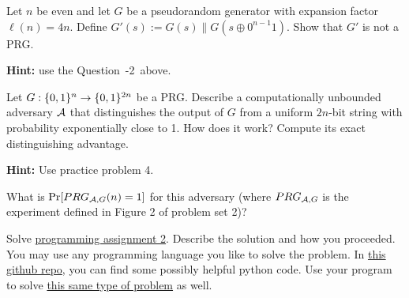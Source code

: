 \documentclass[a4paper,10pt]{article}
\begin{document}
\begin{question}{2}
Let $n$ be even and let $G$ be a pseudorandom generator with expansion factor $\ell(n)=4n$.
Define $G'(s):=G(s) \| G(s \oplus 0^{n-1}1)$. Show that $G'$ is not a PRG.

\noindent\textbf{Hint:} use the Question~\the\numexpr\value{questionnr}-2\relax\ above.
\end{question}
\begin{solution}
\end{solution}

\begin{question}{4}
Let $G:\{0,1\}^n \rightarrow \{0,1\}^{2n}$ be a PRG. Describe a computationally unbounded adversary $\mathcal{A}$ that distinguishes the output of $G$ from a uniform $2n$-bit string with probability exponentially close to 1. How does it work? Compute its exact distinguishing advantage.

\noindent\textbf{Hint:} Use practice problem 4.

What is $\Pr[PRG_{\mathcal{A},G}(n) =1]$ for this adversary (where $PRG_{\mathcal{A},G}$ is the experiment defined in Figure 2 of problem set 2)?
\end{question}
\begin{solution}
\end{solution}



\begin{programming}{8}
Solve \href{https://www.coursera.org/learn/cryptography/supplement/3Iajv/programming-assignment-2}{programming assignment 2}. Describe the solution and how you proceeded. You may use any programming language you like to solve the problem.
In \href{https://github.com/cschaffner/ModernCryptographyCourse/tree/master/programming/MultiTimePad}{this github repo}, you can find some possibly helpful python code. Use your program to solve \href{https://github.com/cschaffner/ModernCryptographyCourse/blob/master/programming/MultiTimePad/ciphertexts.txt}{this same type of problem} as well.
\end{programming}

\begin{solution}
\end{solution}
\end{document}
